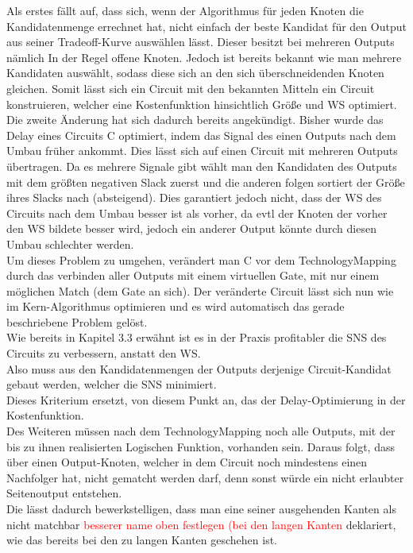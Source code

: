\documentclass[11pt, a4paper, german]{article}
\newcommand{\TM}{TechnologyMapping }
\begin{document}
Als erstes fällt auf, dass sich, wenn der Algorithmus für jeden Knoten die Kandidatenmenge errechnet hat, nicht einfach der beste Kandidat für den Output aus seiner Tradeoff-Kurve auswählen lässt. Dieser besitzt bei mehreren Outputs nämlich In der Regel offene Knoten. 
Jedoch ist bereits bekannt wie man mehrere Kandidaten auswählt, sodass diese sich an den sich überschneidenden Knoten gleichen. Somit lässt sich ein Circuit mit den bekannten Mitteln ein Circuit konstruieren, welcher eine Kostenfunktion hinsichtlich Größe und WS optimiert. \\

Die zweite Änderung hat sich dadurch bereits angekündigt. Bisher wurde das Delay eines Circuits C optimiert, indem das Signal des einen Outputs nach dem Umbau früher ankommt. Dies lässt sich auf einen Circuit mit mehreren Outputs übertragen. Da es mehrere Signale gibt wählt man den Kandidaten des Outputs mit dem größten negativen Slack zuerst und die anderen folgen sortiert der Größe ihres Slacks nach (absteigend). Dies garantiert jedoch nicht, dass der WS des Circuits nach dem Umbau besser ist als vorher, da evtl der Knoten der vorher den WS bildete besser wird, jedoch ein anderer Output könnte durch diesen Umbau schlechter werden. \\
Um dieses Problem zu umgehen, verändert man C vor dem \TM durch das verbinden aller Outputs mit einem virtuellen Gate, mit nur einem möglichen Match (dem Gate an sich). Der veränderte Circuit lässt sich nun wie im Kern-Algorithmus optimieren und es wird automatisch das gerade beschriebene Problem gelöst.\\ 
Wie bereits in Kapitel 3.3  erwähnt ist es in der Praxis profitabler die SNS des Circuits zu verbessern, anstatt den WS.\\
Also muss aus den Kandidatenmengen der Outputs derjenige Circuit-Kandidat gebaut werden, welcher die SNS minimiert.\\
 Dieses Kriterium ersetzt, von diesem Punkt an,  das der Delay-Optimierung in der Kostenfunktion.\\
 
 Des Weiteren müssen nach dem \TM noch alle Outputs, mit der bis zu ihnen realisierten Logischen Funktion, vorhanden sein. Daraus folgt, dass über einen Output-Knoten, welcher in dem Circuit noch mindestens einen Nachfolger hat, nicht gematcht werden darf, denn sonst würde ein nicht erlaubter Seitenoutput entstehen.\\
 Die lässt dadurch bewerkstelligen, dass man eine seiner ausgehenden Kanten als nicht matchbar \textcolor{red}{besserer name oben festlegen (bei den langen Kanten} deklariert, wie das bereits bei den zu langen Kanten geschehen ist. 
\end{document}
